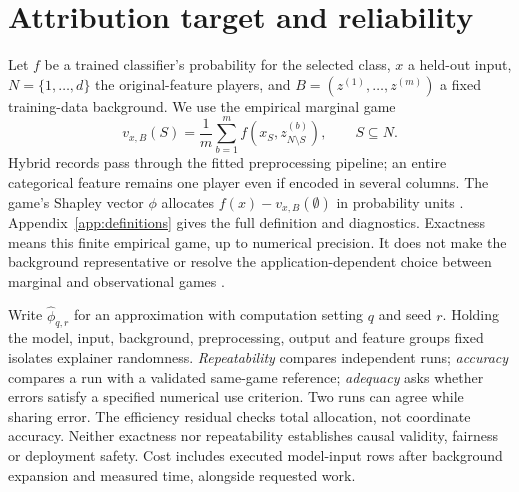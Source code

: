 \section{Attribution target and reliability}
\label{sec:target}

Let $f$ be a trained classifier's probability for the selected class, $x$ a held-out input, $N=\{1,\ldots,d\}$ the original-feature players, and $B=(z^{(1)},\ldots,z^{(m)})$ a fixed training-data background. We use the empirical marginal game
\begin{equation}
 v_{x,B}(S)=\frac{1}{m}\sum_{b=1}^{m}
 f\!\left(x_S,z^{(b)}_{N\setminus S}\right),\qquad S\subseteq N.
 \label{eq:game}
\end{equation}
Hybrid records pass through the fitted preprocessing pipeline; an entire categorical feature remains one player even if encoded in several columns. The game's Shapley vector $\phi$ allocates $f(x)-v_{x,B}(\emptyset)$ in probability units \citep{lundberg2017unified}. Appendix~\ref{app:definitions} gives the full definition and diagnostics. Exactness means this finite empirical game, up to numerical precision. It does not make the background representative or resolve the application-dependent choice between marginal and observational games \citep{chen2020true}.

Write $\widehat\phi_{q,r}$ for an approximation with computation setting $q$ and seed $r$. Holding the model, input, background, preprocessing, output and feature groups fixed isolates explainer randomness. \emph{Repeatability} compares independent runs; \emph{accuracy} compares a run with a validated same-game reference; \emph{adequacy} asks whether errors satisfy a specified numerical use criterion. Two runs can agree while sharing error. The efficiency residual checks total allocation, not coordinate accuracy. Neither exactness nor repeatability establishes causal validity, fairness or deployment safety. Cost includes executed model-input rows after background expansion and measured time, alongside requested work.
